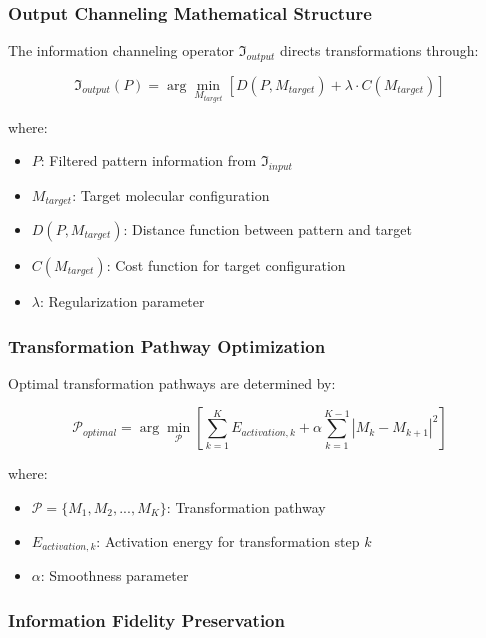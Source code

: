 \subsubsection{Output Channeling Mathematical Structure}

The information channeling operator $\mathfrak{I}_{output}$ directs transformations through:

\begin{equation}
\mathfrak{I}_{output}(P) = \arg\min_{M_{target}} \left[ D(P, M_{target}) + \lambda \cdot C(M_{target}) \right]
\end{equation}

where:
\begin{itemize}
\item $P$: Filtered pattern information from $\mathfrak{I}_{input}$
\item $M_{target}$: Target molecular configuration
\item $D(P, M_{target})$: Distance function between pattern and target
\item $C(M_{target})$: Cost function for target configuration
\item $\lambda$: Regularization parameter
\end{itemize}

\subsubsection{Transformation Pathway Optimization}

Optimal transformation pathways are determined by:

\begin{equation}
\mathcal{P}_{optimal} = \arg\min_{\mathcal{P}} \left[ \sum_{k=1}^{K} E_{activation,k} + \alpha \sum_{k=1}^{K-1} |M_k - M_{k+1}|^2 \right]
\end{equation}

where:
\begin{itemize}
\item $\mathcal{P} = \{M_1, M_2, ..., M_K\}$: Transformation pathway
\item $E_{activation,k}$: Activation energy for transformation step $k$
\item $\alpha$: Smoothness parameter
\end{itemize}

\subsubsection{Information Fidelity Preservation}

